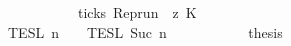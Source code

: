 \begin{isabellebody}
\ \ \ \ \ \ \ \ \ \ \ \ \ \ \ \ \ \ \ \ \ \ \ \ \ \ \ \ {\isasymlongrightarrow}\ ticks\ {\isacharparenleft}{\isacharparenleft}Rep{\isacharunderscore}run\ {\isasymrho}{\isacharparenright}\ z\ K\ {\isacharbraceright}\isanewline
\ \ \ \ \ \ \ \ \ \ \ \ \ \ \ \ {\isasyminter}\ {\isasymlbrakk}{\isasymlbrakk}\ {\isasymPsi}\ {\isasymrbrakk}{\isasymrbrakk}\isactrlsub T\isactrlsub E\isactrlsub S\isactrlsub L\isactrlbsup {\isasymge}\ n\isactrlesup \ {\isasyminter}\ {\isasymlbrakk}{\isasymlbrakk}\ {\isasymPhi}\ {\isasymrbrakk}{\isasymrbrakk}\isactrlsub T\isactrlsub E\isactrlsub S\isactrlsub L\isactrlbsup {\isasymge}\ Suc\ n\isactrlesup {\isacartoucheclose}\isanewline
\ \ \ \ \isamarkupfalse%
\isanewline
\ \ \ \isamarkupfalse%
\ \isamarkupfalse%
\ {\isacharquery}thesis\ \ \isamarkupfalse%
\isanewline
\ \isamarkupfalse%
%
\endisatagproof
{\isafoldproof}%
%
\isadelimproof
\isanewline
%
\endisadelimproof
%
\isadelimtheory
\isanewline
%
\endisadelimtheory
%
\isatagtheory
{}\isamarkupfalse%
%
\endisatagtheory
{\isafoldtheory}%
%
\isadelimtheory
%
\endisadelimtheory
%
\end{isabellebody}%
\endinput
